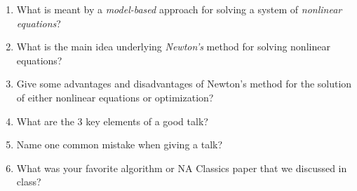 \documentclass[11pt]{article}
\begin{document}
\begin{enumerate}
\vspace{2.5in}
\item What is meant by a {\it model-based} approach for solving a system of {\it nonlinear equations}?
\vspace{2.5in}
\item What is the main idea underlying {\it Newton's} method for solving nonlinear equations?  
\vspace{2.5in}
\item Give some advantages and disadvantages of Newton's method for the solution of either nonlinear equations or optimization?  
\vspace{2.5in}
\item What are the 3 key elements of a good talk?
\vspace{2.5in}
\item Name one common mistake when giving a talk?
\vspace{2.5in}
\item What was your favorite algorithm or NA Classics paper that we discussed in class?
\vspace{2.5in}
\end{enumerate}
\end{document}
